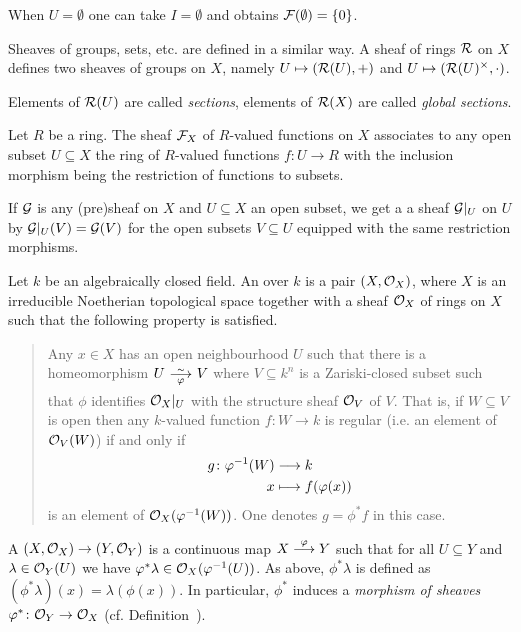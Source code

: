 \documentclass[a4paper,parskip=half,numbers=enddot, DIV=12]{scrreprt}
\begin{document}
\begin{rem}
    When $U=\emptyset$ one can take $I=\emptyset$ and obtains $\mathcal{F}(\emptyset) = \{0\}$.
\end{rem}
\begin{rem}
    Sheaves of groups, sets, etc. are defined in a similar way. A sheaf of rings $\mathcal{R}$ on $X$ defines two sheaves of groups on $X$, namely $U\mapsto (\mathcal{R}(U), +)$ and $U\mapsto (\mathcal{R}(U)^\times, \cdot)$.
\end{rem}
\begin{rem}
    Elements of $\mathcal{R}(U)$ are called \emph{sections}, elements of $\mathcal{R}(X)$ are called \emph{global sections}.
\end{rem}
\begin{example}
	    Let $R$ be a ring. The sheaf $\mathcal{F}_X$ of $R$-valued functions on $X$ associates to any open subset $U\subseteq X$ the ring of $R$-valued functions $f\colon U \to R$ with the inclusion morphism being the restriction of functions to subsets.
\end{example}
\begin{rem*}
	  If $\mathcal{G}$ is any (pre)sheaf on $X$ and $U\subseteq X$ an open subset, we get a a sheaf $\mathcal{G}|_U$ on $U$ by $\mathcal{G}|_U(V) = \mathcal{G}(V)$ for the open subsets $V\subseteq U$ equipped with the same restriction morphisms.
\end{rem*}
\begin{defi} 
	    Let $k$ be an algebraically closed field. An  over $k$ is a pair $(X,\mathcal{O}_X)$, where $X$ is an irreducible Noetherian topological space together with a sheaf $\mathcal{O}_X$ of rings on $X$ such that the following property is satisfied.
	    \begin{quote}
	        Any $x\in X$ has an open neighbourhood $U$ such that there is a homeomorphism $U\isomorphism[\phi] V$ where $V\subseteq k^n$ is a Zariski-closed subset such that $\phi$ identifies $\mathcal{O}_X|_U$ with the structure sheaf $\mathcal{O}_V$ of $V$. That is, if $W \subseteq V$ is open then any $k$-valued function $f\colon W\to k$ is regular (i.e. an element of $\mathcal{O}_V(W)$) if and only if 
	        \begin{align*}
	            g\colon \varphi^{-1}(W) &\longrightarrow k\\
	            x&\longmapsto f(\varphi(x))
	        \end{align*}
	        is an element of $\mathcal{O}_X(\varphi^{-1}(W))$. One denotes $g=\phi^*f$ in this case.
	    \end{quote}
	    A  $(X,\mathcal{O}_X) \to (Y,\mathcal{O}_Y)$ is a continuous map $X\morphism[\phi] Y$ such that for all $U\subseteq Y$ and $\lambda \in \mathcal{O}_Y(U)$ we have $\varphi^\ast \lambda \in \mathcal{O}_X(\varphi^{-1}(U))$. As above, $\phi^\ast\lambda$ is defined as $(\phi^\ast\lambda)(x) = \lambda(\phi(x))$. In particular, $\phi^*$ induces a \emph{morphism of sheaves} $\varphi^*\colon \mathcal{O}_Y\to\mathcal{O}_X$ (cf. Definition~).
	\end{defi}
\end{document}
